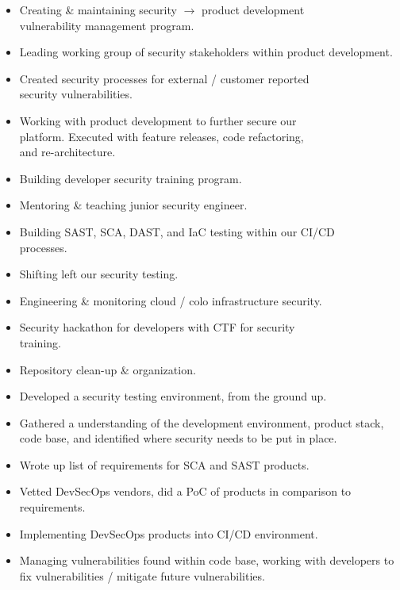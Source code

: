 \documentclass[10pt,a4paper,ragged2e]{rohrbach}
\begin{document}
\begin{paracol}{2}

\begin{itemize}
  \item Creating \& maintaining security $\rightarrow$ product development\\ vulnerability management program.
  \item Leading working group of security stakeholders within product development.
  \item Created security processes for external / customer reported\\ security vulnerabilities.
  \item Working with product development to further secure our\\ platform. Executed with feature releases, code refactoring,\\ and re-architecture.
  \item Building developer security training program.
  \item Mentoring \& teaching junior security engineer.
  \item Building SAST, SCA, DAST, and IaC testing within our CI/CD\\ processes.
  \item Shifting left our security testing.
  \item Engineering \& monitoring cloud / colo infrastructure security.
  \item Security hackathon for developers with CTF for security\\ training.
  \item Repository clean-up \& organization.
\end{itemize}

\divider

\begin{itemize}
  \item Developed a security testing environment, from the ground up.
  \item Gathered a understanding of the development environment, product stack, code base, and identified where security needs to be put in place.
  \item Wrote up list of requirements for SCA and SAST products.
  \item Vetted DevSecOps vendors, did a PoC of products in comparison to requirements.
  \item Implementing DevSecOps products into CI/CD environment.
  \item Managing vulnerabilities found within code base, working with developers to fix vulnerabilities / mitigate future vulnerabilities.
\end{itemize}


\end{paracol}
\end{document}
